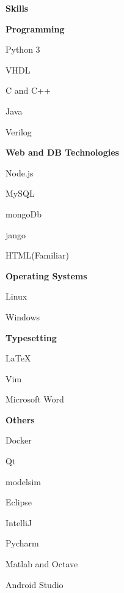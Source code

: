 \documentclass[a4paper,12pt,final]{memoir}
\newcommand{\SmallSep}{\vspace{0.5em}}
\newcommand{\CVSection}[1]
	{\Large\textbf{#1}\par
	\SmallSep\normalsize\normalfont}
\newcommand{\CVItem}[1]
	{\textbf{\color{RoyalBlue} #1}}
\begin{document}
\CVSection{Skills}
\CVItem{Programming}
\begin{multicols}{3}
\begin{compactitem}[\color{RoyalBlue}$\circ$]
	\item Python 3
	\item VHDL
	\item C and C++
	\item Java
	\item Verilog
	
\end{compactitem}
\end{multicols}
\SmallSep
\CVItem{Web and DB Technologies}
\begin{multicols}{3}
\begin{compactitem}[\color{RoyalBlue}$\circ$]
	\item Node.js
	\item MySQL 
	\item mongoDb
	\item jango
	\item HTML(Familiar)
\end{compactitem}
\end{multicols}
\SmallSep
\CVItem{Operating Systems}
\begin{multicols}{3}
\begin{compactitem}[\color{RoyalBlue}$\circ$]
	\item Linux
	\item Windows
\end{compactitem}
\end{multicols}
\SmallSep
\CVItem{Typesetting}
\begin{multicols}{3}
\begin{compactitem}[\color{RoyalBlue}$\circ$]
	\item \LaTeX
	\item Vim
	\item Microsoft Word
\end{compactitem}
\end{multicols}
\SmallSep
\CVItem{Others}
\begin{multicols}{3}
\begin{compactitem}[\color{RoyalBlue}$\circ$]
	\item Docker
	\item Qt
	\item modelsim
	\item Eclipse
	\item IntelliJ
	\item Pycharm
	\item Matlab and Octave
	\item Android Studio
\end{compactitem}
\end{multicols}
\end{document}

